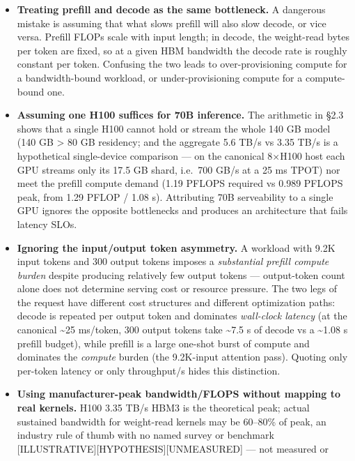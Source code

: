 \begin{itemize}
\item
  \textbf{Treating prefill and decode as the same bottleneck.} A
  dangerous mistake is assuming that what slows prefill will also slow
  decode, or vice versa. Prefill FLOPs scale with input length; in
  decode, the weight-read bytes per token are fixed, so at a given HBM
  bandwidth the decode rate is roughly constant per token. Confusing the
  two leads to over-provisioning compute for a bandwidth-bound workload,
  or under-provisioning compute for a compute-bound one.
\item
  \textbf{Assuming one H100 suffices for 70B inference.} The arithmetic
  in §2.3 shows that a single H100 cannot hold or stream the whole 140
  GB model (140 GB \textgreater{} 80 GB residency; and the aggregate 5.6
  TB/s vs 3.35 TB/s is a hypothetical single-device comparison --- on
  the canonical 8×H100 host each GPU streams only its 17.5 GB shard,
  i.e.~700 GB/s at a 25 ms TPOT) nor meet the prefill compute demand
  (1.19 PFLOPS required vs 0.989 PFLOPS peak, from 1.29 PFLOP / 1.08 s).
  Attributing 70B serveability to a single GPU ignores the opposite
  bottlenecks and produces an architecture that fails latency SLOs.
\item
  \textbf{Ignoring the input/output token asymmetry.} A workload with
  9.2K input tokens and 300 output tokens imposes a \emph{substantial
  prefill compute burden} despite producing relatively few output tokens
  --- output-token count alone does not determine serving cost or
  resource pressure. The two legs of the request have different cost
  structures and different optimization paths: decode is repeated per
  output token and dominates \emph{wall-clock latency} (at the canonical
  \textasciitilde25 ms/token, 300 output tokens take \textasciitilde7.5
  s of decode vs a \textasciitilde1.08 s prefill budget), while prefill
  is a large one-shot burst of compute and dominates the \emph{compute}
  burden (the 9.2K-input attention pass). Quoting only per-token latency
  or only throughput/s hides this distinction.
\item
  \textbf{Using manufacturer-peak bandwidth/FLOPS without mapping to
  real kernels.} H100 3.35 TB/s HBM3 is the theoretical peak; actual
  sustained bandwidth for weight-read kernels may be 60--80\% of peak,
  an industry rule of thumb with no named survey or benchmark
  \mbox{{[}ILLUSTRATIVE{]}}\hspace{0pt}\mbox{{[}HYPOTHESIS{]}}\hspace{0pt}\mbox{{[}UNMEASURED{]}} --- not measured or

\end{itemize}
